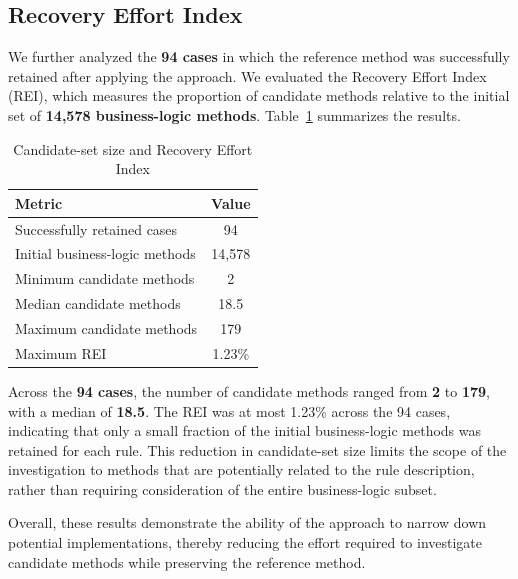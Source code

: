 \subsection{Recovery Effort Index}

We further analyzed the \textbf{94 cases} in which the reference method was successfully retained after applying the approach. We evaluated the Recovery Effort Index (REI), which measures the proportion of candidate methods relative to the initial set of \textbf{14,578 business-logic methods}. Table~\ref{tab:rei_results} summarizes the results.

\begin{table}[htbp]
\centering
\caption{Candidate-set size and Recovery Effort Index}
\label{tab:rei_results}
\begin{tabular}{lc}
\hline
\textbf{Metric} & \textbf{Value} \\
\hline
Successfully retained cases & 94 \\
Initial business-logic methods & 14,578 \\
Minimum candidate methods & 2 \\
Median candidate methods & 18.5 \\
Maximum candidate methods & 179 \\
Maximum REI & 1.23\% \\
\hline
\end{tabular}
\end{table}

Across the \textbf{94 cases}, the number of candidate methods ranged from \textbf{2} to \textbf{179}, with a median of \textbf{18.5}. The REI was at most 1.23\% across the 94 cases, indicating that only a small fraction of the initial business-logic methods was retained for each rule. This reduction in candidate-set size limits the scope of the investigation to methods that are potentially related to the rule description, rather than requiring consideration of the entire business-logic subset.

Overall, these results demonstrate the ability of the approach to narrow down potential implementations, thereby reducing the effort required to investigate candidate methods while preserving the reference method.